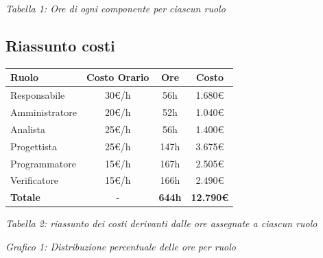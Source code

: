 \documentclass[a4paper,11pt]{article}
\begin{document}
\begin{center}
\textit{Tabella 1: Ore di ogni componente per ciascun ruolo}
\end{center}

\newpage

\subsection{Riassunto costi}

{\footnotesize
\begin{center}
\label{tab:costi-ruoli}
\begin{tabular}{|l|c|c|c|}
\hline
\textbf{Ruolo} & \textbf{Costo Orario} & \textbf{Ore} & \textbf{Costo} \\
\hline
Responsabile & 30\euro/h & 56h & 1.680\euro \\
Amministratore & 20\euro/h & 52h & 1.040\euro \\
Analista & 25\euro/h & 56h & 1.400\euro \\
Progettista & 25\euro/h & 147h & 3.675\euro \\
Programmatore & 15\euro/h & 167h & 2.505\euro \\
Verificatore & 15\euro/h & 166h & 2.490\euro \\
\hline
\textbf{Totale} & - & \textbf{644h} & \textbf{12.790\euro} \\
\hline
\end{tabular}
\end{center}
}

\begin{center}
\textit{Tabella 2: riassunto dei costi derivanti dalle ore assegnate a ciascun ruolo}
\end{center}

\vspace{1cm}

\begin{center}
\end{center}

\begin{center}
\textit{Grafico 1: Distribuzione percentuale delle ore per ruolo}
\end{center}
\end{document}
